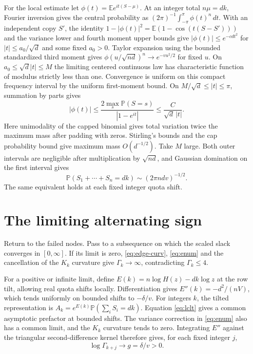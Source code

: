 \documentclass[11pt]{article}
\newcommand{\E}{\mathbb E}
\newcommand{\Prob}{\mathbb P}
\begin{document}
For the local estimate let $\phi(t)=\E e^{it(S-\mu)}$. At an
integer total $n\mu=dk$, Fourier inversion gives the central
probability as $(2\pi)^{-1}\int_{-\pi}^{\pi}\phi(t)^n\,dt$.
With an independent copy $S'$, the identity
$1-|\phi(t)|^2=\E(1-\cos(t(S-S')))$ and the variance lower and
fourth moment upper bounds give $|\phi(t)|\le e^{-c d t^2}$
for $|t|\le a_0/\sqrt d$ and some fixed $a_0>0$. Taylor expansion
using the bounded standardized third moment gives
$\phi(u/\sqrt{nd})^n\to e^{-v u^2/2}$ for fixed $u$.
On $a_0\le\sqrt d|t|\le M$ the limiting centered continuous
law has characteristic function of modulus strictly less than
one. Convergence is uniform on this compact frequency interval
by the uniform first-moment bound. On $M/\sqrt d\le |t|\le\pi$,
summation by parts gives
\[
|\phi(t)|\le \frac{2\max_s\Prob(S=s)}{|1-e^{it}|}
            \le\frac{C}{\sqrt d\,|t|}.
\]
Here unimodality of the capped binomial gives total variation
twice the maximum mass after padding with zeros. Stirling's bounds
and the cap probability bound give maximum mass $O(d^{-1/2})$.
Take $M$ large. Both outer intervals are negligible after multiplication
by $\sqrt{nd}$, and Gaussian domination on the first interval gives
\begin{equation}\label{eq:lclt}
\Prob(S_1+\cdots+S_n=dk)\sim(2\pi nd v)^{-1/2}.
\end{equation}
The same equivalent holds at each fixed integer quota shift.

\section{The limiting alternating sign}

Return to the failed nodes. Pass to a subsequence on which the
scaled slack converges in $[0,\infty]$. If its limit is zero,
\eqref{eq:edge-curv}, \eqref{eq:enum} and the cancellation of
the $K_k$ curvature give $\Gamma_k\to\infty$, contradicting
$\Gamma_k\le4$.

For a positive or infinite limit, define
$E(k)=n\log H(z)-dk\log z$ at the row tilt, allowing real quota
shifts locally. Differentiation gives $E''(k)=-d^2/(nV)$,
which tends uniformly on bounded shifts to $-\delta/v$.
For integers $k$, the tilted representation is
$A_k=e^{E(k)}\Prob(\sum_i S_i=dk)$. Equation \eqref{eq:lclt}
gives a common asymptotic prefactor at bounded shifts. The
variance correction in \eqref{eq:enum} also has a common limit,
and the $K_k$ curvature tends to zero. Integrating $E''$ against
the triangular second-difference kernel therefore gives, for
each fixed integer $j$,
\[
\log\Gamma_{k+j}\longrightarrow g=\delta/v>0.
\]
\end{document}
